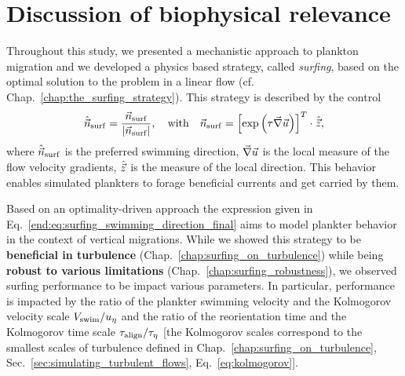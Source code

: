 \chapter{Discussion of biophysical relevance}\label{chap:bio_discussion}

Throughout this study, we presented a mechanistic approach to plankton migration and we developed a physics based strategy, called \textit{surfing}, based on the optimal solution to the problem in a linear flow (cf. Chap.~\ref{chap:the_surfing_strategy}).
This strategy is described by the control
\begin{equation}
	\label{end:eq:surfing_swimming_direction_final}
	\hat{\vec{n}}_{\mathrm{surf}} = \frac{\vec{n}_{\mathrm{surf}}}{\lvert\vec{n}_{\mathrm{surf}}\rvert}, \quad \text{with} \quad \vec{n}_{\mathrm{surf}} = \left[ \exp \left( \tau \vec{\nabla} \vec{u} \right) \right]^T \cdot \hat{\vec{z}},
\end{equation}
where $\hat{\vec{n}}_{\mathrm{surf}}$ is the preferred swimming direction, $\vec{\nabla} \vec{u}$ is the local measure of the flow velocity gradients, $\hat{\vec{z}}$ is the measure of the local direction.
This behavior enables simulated plankters to forage beneficial currents and get carried by them.

Based on an optimality-driven approach the expression given in Eq.~\ref{end:eq:surfing_swimming_direction_final} aims to model plankter behavior in the context of vertical migrations.
While we showed this strategy to be \textbf{beneficial in turbulence} (Chap.~\ref{chap:surfing_on_turbulence}) while being \textbf{robust to various limitations} (Chap.~\ref{chap:surfing_robustness}), we observed surfing performance to be impact various parameters. 
In particular, performance is impacted by the ratio of the plankter swimming velocity and the Kolmogorov velocity scale $V_{\mathrm{swim}}/u_{\eta}$ and the ratio of the reorientation time and the Kolmogorov time scale $\tau_{\mathrm{align}}/\tau_{\eta}$ [the Kolmogorov scales correspond to the smallest scales of turbulence defined in Chap.~\ref{chap:surfing_on_turbulence}, Sec.~\ref{sec:simulating_turbulent_flows}, Eq.~\eqref{eq:kolmogorov}].

